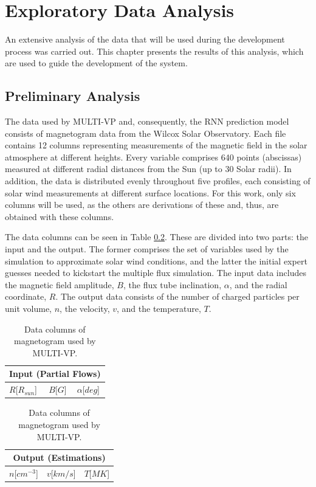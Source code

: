 \chapter*{Exploratory Data Analysis}\label{chap:eda}
An extensive analysis of the data that will be used during the development process was carried out. This chapter presents the results of this analysis, which are used to guide the development of the system.


\section{Preliminary Analysis}\label{sec:data_prelim_analysis}
The data used by MULTI-VP and, consequently, the RNN prediction model consists of magnetogram data from the Wilcox Solar Observatory. Each file contains 12 columns representing measurements of the magnetic field in the solar atmosphere at different heights. Every variable comprises 640 points (abscissas) measured at different radial distances from the Sun (up to 30 Solar radii). In addition, the data is distributed evenly throughout five profiles, each consisting of solar wind measurements at different surface locations. For this work, only six columns will be used, as the others are derivations of these and, thus, are obtained with these columns. 

The data columns can be seen in Table \ref{tab:multivp_columns}. These are divided into two parts: the input and the output. The former comprises the set of variables used by the simulation to approximate solar wind conditions, and the latter the initial expert guesses needed to kickstart the multiple flux simulation. The input data includes the magnetic field amplitude, $B$, the flux tube inclination, $\alpha$, and the radial coordinate, $R$. The output data consists of the number of charged particles per unit volume, $n$, the velocity, $v$, and the temperature, $T$.

\begin{table}[ht]
    \caption{Data columns of magnetogram used by MULTI-VP.}
    \label{tab:multivp_columns}
    \begin{subtable}[h]{0.32\textwidth}
        \centering
        \begin{tabular}{lcc}
        \hline
        \multicolumn{3}{c}{Input (Partial Flows)}                              \\ \hline
        $R${[}$R_{sun}${]} & $B${[}$G${]} & $\alpha${[}$deg${]} \\ \hline
        \end{tabular}
    \end{subtable}
    \begin{subtable}[h]{0.32\textwidth}
        \centering
        \begin{tabular}{ccc}
        \hline
        \multicolumn{3}{c}{Output (Estimations)}                           \\ \hline
        $n${[}$cm^{-3}${]} & $v${[}$km/s${]} & $T${[}$MK${]} \\ \hline
        \end{tabular}
    \end{subtable}
\end{table}

